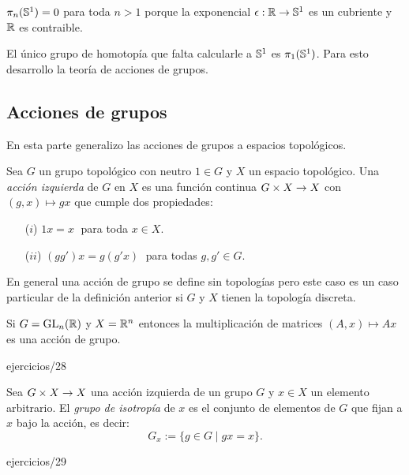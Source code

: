 \documentclass[../../topologia_algebraica]{subfiles}
\begin{document}
\begin{ejemplo}
  $\pi_n(\mathbb{S}^1)=0$ para toda $n>1$ porque la exponencial $\epsilon:\mathbb{R}\rightarrow\mathbb{S}^1$ es un cubriente
  y $\mathbb{R}$ es contraible.
\end{ejemplo}

El \'unico grupo de homotop\'ia que falta calcularle a $\mathbb{S}^1$ es $\pi_1(\mathbb{S}^1)$. Para esto
desarrollo la teor\'ia de acciones de grupos.

\subsection{Acciones de grupos}

En esta parte generalizo las acciones de grupos a espacios topol\'ogicos.

\begin{defin}
  Sea $G$ un grupo topol\'ogico con neutro $1\in G$ y $X$ un espacio topol\'ogico. Una
  \emph{acci\'on izquierda} de $G$ en $X$ es una funci\'on continua $G\times X\rightarrow X$ con
  $(g,x)\mapsto gx$ que cumple dos propiedades:
  \begin{enumerate}
  \item[($i$)] $1 x =x\;$ para toda $x\in X$.
  \item[($ii$)] $(g g') x= g(g' x)\;$ para todas $g,g'\in G$.
  \end{enumerate}
\end{defin}

En general una acci\'on de grupo se define sin topolog\'ias pero este caso es un caso particular
de la definici\'on anterior si $G$ y $X$ tienen la topolog\'ia discreta.

\begin{ejemplo}
  Si $G=\text{GL}_n(\mathbb{R})$ y $X=\mathbb{R}^n$ entonces la multiplicaci\'on de matrices $(A,x)\mapsto Ax$
  es una acci\'on de grupo.
\end{ejemplo}

{ejercicios/28} %

\begin{defin}
  Sea $G\times X\rightarrow X$ una acci\'on izquierda de un grupo $G$ y $x\in X$ un elemento arbitrario.
  El \emph{grupo de isotrop\'ia} de $x$ es el conjunto de elementos de $G$ que fijan a $x$ bajo
  la acci\'on, es decir:
  \[
    G_x:=\{g\in G \mid gx=x\}.
  \]
\end{defin}

{ejercicios/29} %
\end{document}
